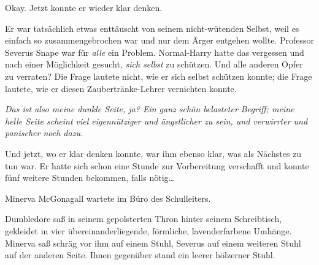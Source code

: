Okay. Jetzt konnte er wieder klar denken.

Er war tatsächlich etwas enttäuscht von seinem nicht-wütenden Selbst, weil es einfach so zusammengebrochen war und nur dem Ärger entgehen wollte. Professor Severus Snape war für \emph{alle} ein Problem. Normal-Harry hatte das vergessen und nach einer Möglichkeit gesucht, \emph{sich selbst} zu schützen. Und alle anderen Opfer zu verraten? Die Frage lautete nicht, wie er sich selbst schützen konnte; die Frage lautete, wie er diesen Zaubertränke-Lehrer vernichten konnte.

\emph{Das ist also meine dunkle Seite, ja? Ein ganz schön belasteter Begriff; meine helle Seite scheint viel eigennütziger und ängstlicher zu sein, und verwirrter und panischer noch dazu.}

Und jetzt, wo er klar denken konnte, war ihm ebenso klar, was als Nächstes zu tun war. Er hatte sich schon eine Stunde zur Vorbereitung verschafft und konnte fünf weitere Stunden bekommen, falls nötig…

\later

Minerva McGonagall wartete im Büro des Schulleiters.

Dumbledore saß in seinem gepolsterten Thron hinter seinem Schreibtisch, gekleidet in vier übereinanderliegende, förmliche, lavenderfarbene Umhänge. Minerva saß schräg vor ihm auf einem Stuhl, Severus auf einem weiteren Stuhl auf der anderen Seite. Ihnen gegenüber stand ein leerer hölzerner Stuhl.


